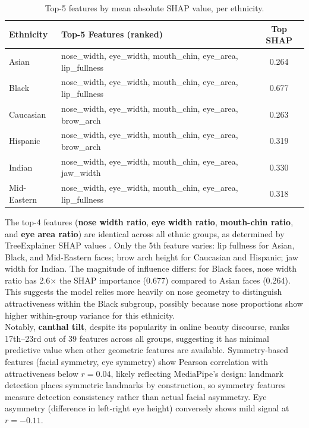 \documentclass[a4paper,oneside,bibliography=totoc]{scrbook}
\begin{document}
\begin{table}[h]
\centering
\caption{Top-5 features by mean absolute SHAP value, per ethnicity.}
\label{tab:shap}
\small
\begin{tabular}{llc}
\toprule
\textbf{Ethnicity} & \textbf{Top-5 Features (ranked)} & \textbf{Top SHAP} \\
\midrule
Asian & nose\_width, eye\_width, mouth\_chin, eye\_area, lip\_fullness & 0.264 \\
Black & nose\_width, eye\_width, mouth\_chin, eye\_area, lip\_fullness & 0.677 \\
Caucasian & nose\_width, eye\_width, mouth\_chin, eye\_area, brow\_arch & 0.263 \\
Hispanic & nose\_width, eye\_width, mouth\_chin, eye\_area, brow\_arch & 0.319 \\
Indian & nose\_width, eye\_width, mouth\_chin, eye\_area, jaw\_width & 0.330 \\
Mid-Eastern & nose\_width, eye\_width, mouth\_chin, eye\_area, lip\_fullness & 0.318 \\
\bottomrule
\end{tabular}
\end{table}

The top-4 features (\textbf{nose width ratio}, \textbf{eye width ratio}, \textbf{mouth-chin ratio}, and \textbf{eye area ratio}) are identical across all ethnic groups, as determined by TreeExplainer SHAP values \cite{lundberg2017shap}. Only the 5th feature varies: lip fullness for Asian, Black, and Mid-Eastern faces; brow arch height for Caucasian and Hispanic; jaw width for Indian. The magnitude of influence differs: for Black faces, nose width ratio has 2.6$\times$ the SHAP importance (0.677) compared to Asian faces (0.264). This suggests the model relies more heavily on nose geometry to distinguish attractiveness within the Black subgroup, possibly because nose proportions show higher within-group variance for this ethnicity.\\
Notably, \textbf{canthal tilt}, despite its popularity in online beauty discourse, ranks 17th--23rd out of 39 features across all groups, suggesting it has minimal predictive value when other geometric features are available. Symmetry-based features (facial symmetry, eye symmetry) show Pearson correlation with attractiveness below $r=0.04$, likely reflecting MediaPipe's design: landmark detection places symmetric landmarks by construction, so symmetry features measure detection consistency rather than actual facial asymmetry. Eye asymmetry (difference in left-right eye height) conversely shows mild signal at $r=-0.11$.\\
\end{document}
